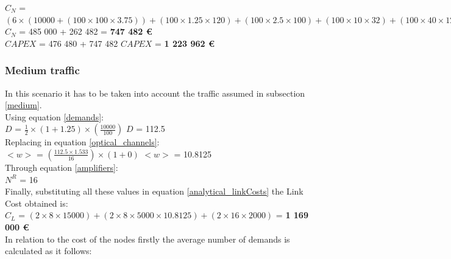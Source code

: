 
$C_N$ = $(6 \times (10 000 + (1 00 \times 100 \times 3.75)) + (100 \times 1.25 \times 120) + (100 \times 2.5 \times 100) + (100 \times 10 \times 32) + (100 \times 40 \times 12) + (100 \times 100 \times 8)) + (6 \times (20 000 + (2 500 \times 9.4988 )))$\\

$C_N$ = 485 000 + 262 482 = \textbf{747 482 \euro}\\

$CAPEX$ = 476 480 + 747 482 \qquad \qquad $CAPEX$ = \textbf{1 223 962 \euro}\\


\subsubsection{Medium traffic}
\vspace{11pt}
In this scenario it has to be taken into account the traffic assumed in subsection \ref{medium}.\\

Using equation \ref{demands}:\\

$D$ = ${\frac{1}{2}} \times {( 1 + 1.25 )} \times ( \frac{10000}{100} )$ \qquad \qquad $D$ = 112.5\\

Replacing in equation \ref{optical_channels}:\\

$<w>$ = $(\frac{112.5 \times 1.533}{16} ) \times ( 1 + 0)$ \qquad \qquad $<w>$ = 10.8125\\

Through equation \ref{amplifiers}:\\

$N^R$ = 16\\

Finally, substituting all these values in equation \ref{analytical_linkCosts} the Link Cost obtained is:\\

$C_L$ = $(2 \times 8 \times 15 000) + (2 \times 8 \times 5 000 \times 10.8125) + (2 \times 16 \times 2000)$ = \textbf{1 169 000 \euro}\\

In relation to the cost of the nodes firstly the average number of demands is calculated as it follows:\\

